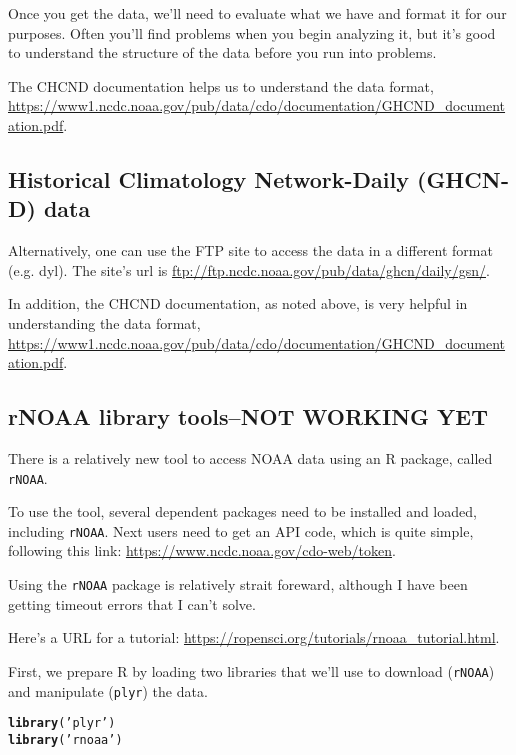 \documentclass{article}\usepackage[]{graphicx}\usepackage[]{color}
\makeatletter
\newcommand{\hlstr}[1]{\textcolor[rgb]{0.192,0.494,0.8}{#1}}%
\newcommand{\hlstd}[1]{\textcolor[rgb]{0.345,0.345,0.345}{#1}}%
\newcommand{\hlkwd}[1]{\textcolor[rgb]{0.737,0.353,0.396}{\textbf{#1}}}%
\newenvironment{kframe}{%
 \def\at@end@of@kframe{}%
 \ifinner\ifhmode%
  \def\at@end@of@kframe{\end{minipage}}%
  \begin{minipage}{\columnwidth}%
 \fi\fi%
 \def\FrameCommand##1{\hskip\@totalleftmargin \hskip-\fboxsep
 \colorbox{shadecolor}{##1}\hskip-\fboxsep
     \hskip-\linewidth \hskip-\@totalleftmargin \hskip\columnwidth}%
 \MakeFramed {\advance\hsize-\width
   \@totalleftmargin\z@ \linewidth\hsize
   \@setminipage}}%
 {\par\unskip\endMakeFramed%
 \at@end@of@kframe}
\newenvironment{knitrout}{}{} %
\makeatother
\begin{document}
Once you get the data, we'll need to evaluate what we have and format it for our purposes. Often you'll find problems when you begin analyzing it, but it's good to understand the structure of the data before you run into problems. 

The CHCND documentation helps us to understand the data format, \url{https://www1.ncdc.noaa.gov/pub/data/cdo/documentation/GHCND_documentation.pdf}.

\subsection{Historical Climatology Network-Daily (GHCN‐D) data}

Alternatively, one can use the FTP site to access the data in a different format (e.g. dyl). The site's url is \url{ftp://ftp.ncdc.noaa.gov/pub/data/ghcn/daily/gsn/}. 

In addition, the CHCND documentation, as noted above, is very helpful in understanding the data format, \url{https://www1.ncdc.noaa.gov/pub/data/cdo/documentation/GHCND_documentation.pdf}.

\subsection{rNOAA library tools--NOT WORKING YET}

There is a relatively new tool to access NOAA data using an R package, called \texttt{rNOAA}. 

To use the tool, several dependent packages need to be installed and loaded, including \texttt{rNOAA}. Next users need to get an API code, which is quite simple, following this link: \url{https://www.ncdc.noaa.gov/cdo-web/token}.

Using the \texttt{rNOAA} package is relatively strait foreward, although I have been getting timeout errors that I can't solve. 

Here's a URL for a tutorial: \url{https://ropensci.org/tutorials/rnoaa_tutorial.html}.

First, we prepare R by loading two libraries that we'll use to download (\texttt{rNOAA}) and manipulate (\texttt{plyr}) the data.
\begin{knitrout}
\color{fgcolor}\begin{kframe}
\begin{alltt}
\hlkwd{library}\hlstd{(}\hlstr{'plyr'}\hlstd{)}
\hlkwd{library}\hlstd{(}\hlstr{'rnoaa'}\hlstd{)}
\end{alltt}


{\ttfamily\noindent\bfseries{}}\end{kframe}
\end{knitrout}
\end{document}
